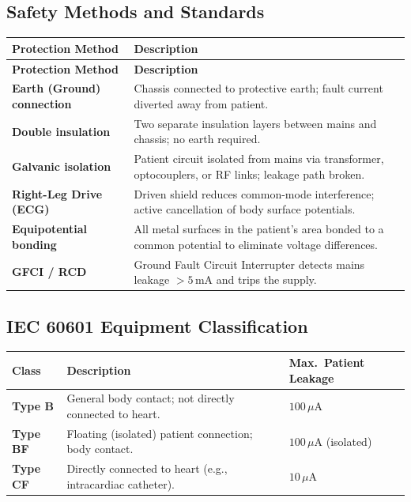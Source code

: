 \documentclass[12pt,a4paper]{article}
\begin{document}
\subsection{Safety Methods and Standards}

\par\noindent
\begingroup
\setlength{\LTleft}{0pt}
\setlength{\LTright}{0pt}
\begin{longtable}{|B{3.0cm}|>{\small\raggedright\arraybackslash}m{\dimexpr(\linewidth-3.0cm-4\arrayrulewidth)/1\relax}|}
\hline
\textbf{Protection Method} & \textbf{Description} \\
\hline
\endfirsthead
\hline
\textbf{Protection Method} & \textbf{Description} \\
\hline
\endhead
\textbf{Earth (Ground) connection} & Chassis connected to protective earth; fault current diverted away from patient. \\
\hline
\textbf{Double insulation} & Two separate insulation layers between mains and chassis; no earth required. \\
\hline
\textbf{Galvanic isolation} & Patient circuit isolated from mains via transformer, optocouplers, or RF links; leakage path broken. \\
\hline
\textbf{Right-Leg Drive (ECG)} & Driven shield reduces common-mode interference; active cancellation of body surface potentials. \\
\hline
\textbf{Equipotential bonding} & All metal surfaces in the patient's area bonded to a common potential to eliminate voltage differences. \\
\hline
\textbf{GFCI / RCD} & Ground Fault Circuit Interrupter detects mains leakage $> 5\,\text{mA}$ and trips the supply. \\
\hline
\end{longtable}
\endgroup

\subsection{IEC 60601 Equipment Classification}

\par\noindent
\begin{tabularx}{\linewidth}{|B{2.0cm}|Y|>{\centering\arraybackslash}m{2.8cm}|}
\hline
\textbf{Class} & \textbf{Description} & \textbf{Max.\ Patient Leakage} \\
\hline
\textbf{Type B} & General body contact; not directly connected to heart. & $100\,\mu\text{A}$ \\
\hline
\textbf{Type BF} & Floating (isolated) patient connection; body contact. & $100\,\mu\text{A}$ (isolated) \\
\hline
\textbf{Type CF} & Directly connected to heart (e.g., intracardiac catheter). & $10\,\mu\text{A}$ \\
\hline
\end{tabularx}
\end{document}
